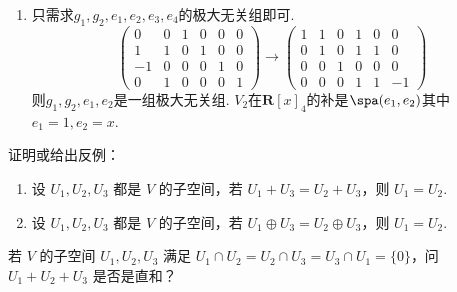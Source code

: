 \begin{exercise}
\begin{exgroup}
\begin{answer}
\begin{enumerate}
                \item 只需求$g_1,g_2,e_1,e_2,e_3,e_4$的极大无关组即可.
                      \[\begin{pmatrix}
                              0  & 0 & 1 & 0 & 0 & 0 \\
                              1  & 1 & 0 & 1 & 0 & 0 \\
                              -1 & 0 & 0 & 0 & 1 & 0 \\
                              0  & 1 & 0 & 0 & 0 & 1\end{pmatrix}\rightarrow
                          \begin{pmatrix}
                              1 & 1 & 0 & 1 & 0 & 0  \\
                              0 & 1 & 0 & 1 & 1 & 0  \\
                              0 & 0 & 1 & 0 & 0 & 0  \\
                              0 & 0 & 0 & 1 & 1 & -1\end{pmatrix}\]
                      则$g_1,g_2,e_1,e_2$是一组极大无关组. $V_2$在$\mathbf{R}[x]_4$的补是$\spa(e_1,e_2)$其中$e_1=1,e_2=x$.
            \end{enumerate}
        \end{answer}
        \item 证明或给出反例：
        \begin{enumerate}
            \item 设 $U_1, U_2, U_3$ 都是 $V$ 的子空间，若 $U_1 + U_3 = U_2 + U_3$，则 $U_1 = U_2$.
            \item 设 $U_1, U_2, U_3$ 都是 $V$ 的子空间，若 $U_1 \oplus U_3 = U_2 \oplus U_3$，则 $U_1 = U_2$.
        \end{enumerate}
        \begin{answer}

        \end{answer}

        \item 若 $V$ 的子空间 $U_1,U_2,U_3$ 满足 $U_1 \cap U_2 = U_2 \cap U_3 = U_3 \cap U_1 = \{0\}$，问 $U_1 + U_2 + U_3$ 是否是直和？
        \begin{answer}

        \end{answer}


\end{exgroup}
\end{exercise}
